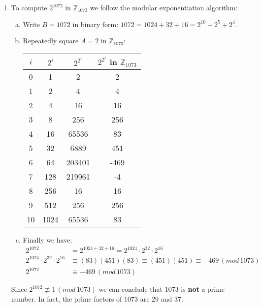 \documentclass{article}
\begin{document}
\begin{enumerate}[1.]
    \item To compute $2^{1072}$ in $\mathbb{Z}_{1073}$ we follow the modular exponentiation algorithm:
    \begin{enumerate}[(a)]
        \item Write $B = 1072$ in binary form: $1072 = 1024 + 32 + 16 = 2^{10} + 2^5 + 2^4$.
        \item Repeatedly square $A = 2$ in $\mathbb{Z}_{1073}$:
    	\begin{table}[ht]
    		\centering
    		\begin{tabular}{cccc}
    			\toprule
    			$i$ & $2^i$ & $2^{2^i}$ & $2^{2^i}$ in $\mathbb{Z}_{1073}$ \\
    			\midrule
    			0 & 1 & 2 & 2 \\
    			1 & 2 & 4 & 4 \\
    			2 & 4 & 16 & 16 \\
    			3 & 8 & 256 & 256 \\
    			4 & 16 & 65536 & 83 \\
    			5 & 32 & 6889 & 451 \\
    			6 & 64 & 203401 & -469 \\
    			7 & 128 & 219961 & -4 \\
    			8 & 256 & 16 & 16 \\
    			9 & 512 & 256 & 256 \\
    			10 & 1024 & 65536 & 83 \\
    			\bottomrule
    		\end{tabular}
        \end{table}
        \item Finally we have: 
        \begin{align*}
            2^{1072} &= 2^{1024 + 32 + 16} = 2^{1024}\cdot2^{32}\cdot2^{16} \\
            2^{1024}\cdot2^{32}\cdot2^{16} &\equiv (83)(451)(83) \equiv (451)(451) \equiv -469 \,(mod\,1073) \\
            2^{1072} &\equiv -469 \,(mod\,1073)
        \end{align*}
    \end{enumerate}
    Since $2^{1072} \not\equiv 1 \,(mod\,1073)$ we can conclude that $1073$ is \textbf{not} a prime number. In fact, the prime factors of $1073$ are $29$ and $37$.
    

\end{enumerate}
\end{document}
